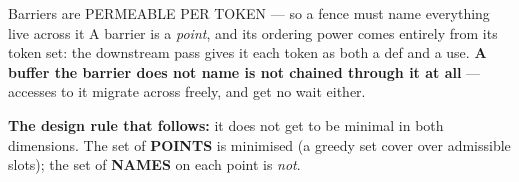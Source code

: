 \documentclass[aspectratio=169,9pt]{beamer}
\newcommand{\key}[1]{\textcolor{acc}{\textbf{#1}}}
\newcommand{\bad}[1]{\textcolor{warn}{\textbf{#1}}}
\begin{document}
\begin{frame}{Barriers are PERMEABLE PER TOKEN --- so a fence must name everything live across it}
\footnotesize
A barrier is a \emph{point}, and its ordering power comes entirely from its token set: the downstream pass gives
it each token as both a def and a use. \bad{A buffer the barrier does not name is not chained through it at all}
--- accesses to it migrate across freely, and get no wait either.

\begin{center}
\end{center}
\vspace{-2mm}
\begin{center}
\begin{minipage}{0.86\textwidth}
\key{The design rule that follows:} it does not get to be minimal in both dimensions.
The set of \textbf{POINTS} is minimised (a greedy set cover over admissible slots); the set of \textbf{NAMES}
on each point is \emph{not}.
\end{minipage}
\end{center}


\end{frame}
\end{document}
